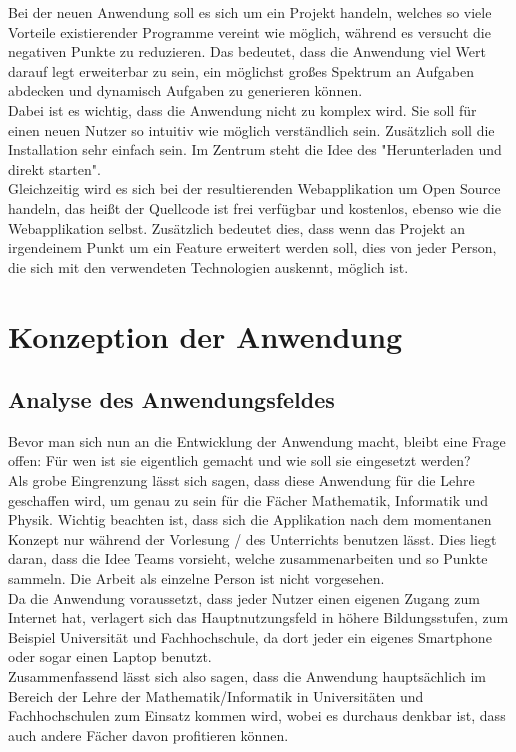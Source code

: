 Bei der neuen Anwendung soll es sich um ein Projekt handeln, welches so viele Vorteile existierender Programme vereint wie möglich, während es versucht die negativen Punkte zu reduzieren. Das bedeutet, dass die Anwendung viel Wert darauf legt erweiterbar zu sein, ein möglichst großes Spektrum an Aufgaben abdecken und dynamisch Aufgaben zu generieren können. \\
Dabei ist es wichtig, dass die Anwendung nicht zu komplex wird. Sie soll für einen neuen Nutzer so intuitiv wie möglich verständlich sein. Zusätzlich soll die Installation sehr einfach sein. Im Zentrum steht die Idee des "Herunterladen und direkt starten". \\
Gleichzeitig wird es sich bei der resultierenden Webapplikation um Open Source handeln, das heißt der Quellcode ist frei verfügbar und kostenlos, ebenso wie die Webapplikation selbst. Zusätzlich bedeutet dies, dass wenn das Projekt an irgendeinem Punkt um ein Feature erweitert werden soll, dies von jeder Person, die sich mit den verwendeten Technologien auskennt, möglich ist.

\chapter{Konzeption der Anwendung}

\section{Analyse des Anwendungsfeldes}

Bevor man sich nun an die Entwicklung der Anwendung macht, bleibt eine Frage offen: Für wen ist sie eigentlich gemacht und wie soll sie eingesetzt werden? \\
Als grobe Eingrenzung lässt sich sagen, dass diese Anwendung für die Lehre geschaffen wird, um genau zu sein für die Fächer Mathematik, Informatik und Physik. Wichtig beachten ist, dass sich die Applikation nach dem momentanen Konzept nur während der Vorlesung / des Unterrichts benutzen lässt. Dies liegt daran, dass die Idee Teams vorsieht, welche zusammenarbeiten und so Punkte sammeln. Die Arbeit als einzelne Person ist nicht vorgesehen. \\
Da die Anwendung voraussetzt, dass jeder Nutzer einen eigenen Zugang zum Internet hat, verlagert sich das Hauptnutzungsfeld in höhere Bildungsstufen, zum Beispiel Universität und Fachhochschule, da dort jeder ein eigenes Smartphone oder sogar einen Laptop benutzt. \\
Zusammenfassend lässt sich also sagen, dass die Anwendung hauptsächlich im Bereich der Lehre der Mathematik/Informatik in Universitäten und Fachhochschulen zum Einsatz kommen wird, wobei es durchaus denkbar ist, dass auch andere Fächer davon profitieren können.

